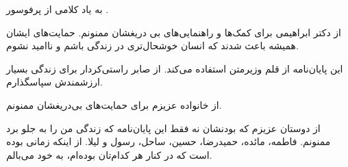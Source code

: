 


\begin{center}
\end{center}

به یاد کلامی از پرفوسور
.

از دکتر ابراهیمی برای کمک‌ها و راهنمایی‌های بی دریغشان ممنونم. حمایت‌های ایشان همیشه باعث شدند که انسان خوشحال‌تری در زندگی باشم و ناامید نشوم.

این پایان‌نامه از قلم وزیرمتن استفاده می‌کند. از صابر راستی‌کردار برای زندگی بسیار ارزشمندش سپاسگذارم.

از خانواده عزیزم برای حمایت‌های بی‌دریغشان ممنونم.

از دوستان عزیزم که بودنشان نه فقط این پایان‌نامه که زندگی من را به جلو برد ممنونم. فاطمه، مائده، حمیدرضا، حسین، ساحل، رسول و لیلا. از اینکه زمانی بوده است که در کنار هر کدام‌تان بوده‌ام، به خود می‌بالم.

\newpage
